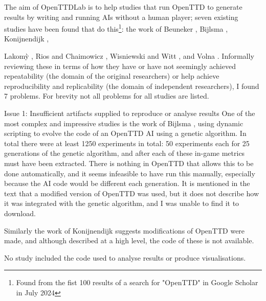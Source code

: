 \documentclass[logo,msc,dsti]{style/infthesis}    %
\newcommand{\singlespacedfootnote}[1]{{\singlespace\footnote{#1}}}
\begin{document}
The aim of OpenTTDLab is to help studies that run OpenTTD to generate results by writing and running AIs without a human player; seven existing studies have been found that do this\singlespacedfootnote{Found from the fist 100 results of a search for "OpenTTD" in Google Scholar in July 2024}: the work of Beuneker \cite{beuneker2019autonomous}, Bijlsma \cite{bijlsma2014evolving}, Konijnendijk \cite{konijnendijk2015mcts}, {Lakom{\`y} \cite{lakomy2020railroad}, Rios and Chaimowicz \cite{rios2009trains}, Wisniewski and Witt \cite{wisniewski2011artificial}, and Volna \cite{volna2017fuzzy}. Informally reviewing these in terms of how they have or have not seemingly achieved repeatability (the domain of the original researchers) or help achieve reproducibility and replicability (the domain of independent researchers), I found 7 problems. For brevity not all problems for all studies are listed.

\begin{itemize}

\begin{descitem}{Issue 1: Insufficient artifacts supplied to reproduce or analyse results}
One of the most complex and impressive studies is the work of Bijlsma \cite{bijlsma2014evolving}, using dynamic scripting to evolve the code of an OpenTTD AI using a genetic algorithm. In total there were at least 1250 experiments in total: 50 experiments each for 25 generations of the genetic algorithm, and after each of these in-game metrics must have been extracted. There is nothing in OpenTTD that allows this to be done automatically, and it seems infeasible to have run this manually, especially because the AI code would be different each generation. It is mentioned in the text that a modified version of OpenTTD was used, but it does not describe how it was integrated with the genetic algorithm, and I was unable to find it to download.

Similarly the work of Konijnendijk \cite{konijnendijk2015mcts} suggests modifications of OpenTTD were made, and although described at a high level, the code of these is not available.

No study included the code used to analyse results or produce visualisations.
\end{descitem}


\end{itemize}}
\end{document}
